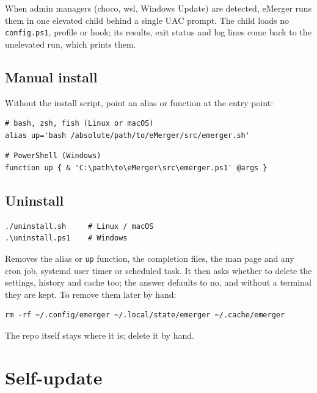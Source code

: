 \documentclass[11pt,a4paper]{article}
\begin{document}
When admin managers (choco, wsl, Windows Update) are detected, eMerger
runs them in one elevated child behind a single UAC prompt. The child
loads no \texttt{config.ps1}, profile or hook; its results, exit status
and log lines come back to the unelevated run, which prints them.

\subsection{Manual install}

Without the install script, point an alias or function at the entry
point:

\begin{lstlisting}[language=bashplus]
# bash, zsh, fish (Linux or macOS)
alias up='bash /absolute/path/to/eMerger/src/emerger.sh'
\end{lstlisting}

\begin{lstlisting}[language=psplus]
# PowerShell (Windows)
function up { & 'C:\path\to\eMerger\src\emerger.ps1' @args }
\end{lstlisting}

\subsection{Uninstall}

\begin{lstlisting}[language=bashplus]
./uninstall.sh     # Linux / macOS
.\uninstall.ps1    # Windows
\end{lstlisting}

Removes the alias or \texttt{up} function, the completion files, the man
page and any cron job, systemd user timer or scheduled task. It then asks
whether to delete the settings, history and cache too; the answer defaults
to no, and without a terminal they are kept. To remove them later by hand:

\begin{lstlisting}[language=bashplus]
rm -rf ~/.config/emerger ~/.local/state/emerger ~/.cache/emerger
\end{lstlisting}

The repo itself stays where it is; delete it by hand.

\section{Self-update}\label{sec:selfupdate}
\end{document}
